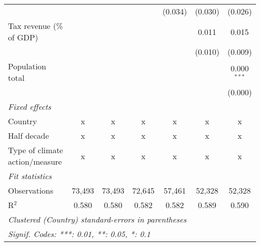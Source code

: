 \begin{tabular}{lcccccc}
                                                               &         &               &                & (0.034)       & (0.030)       & (0.026)\\   
   Tax revenue (\% of GDP)                                     &         &               &                &               & 0.011         & 0.015\\   
                                                               &         &               &                &               & (0.010)       & (0.009)\\   
   Population total                                            &         &               &                &               &               & 0.000$^{***}$\\   
                                                               &         &               &                &               &               & (0.000)\\   
   \emph{Fixed effects}\\
   Country                                                     & x       & x             & x              & x             & x             & x\\  
   Half decade                                                 & x       & x             & x              & x             & x             & x\\  
   Type of climate action/measure                              & x       & x             & x              & x             & x             & x\\  
   \midrule \emph{Fit statistics}\\
   Observations                                                & 73,493  & 73,493        & 72,645         & 57,461        & 52,328        & 52,328\\  
   R$^2$                                                       & 0.580   & 0.580         & 0.582          & 0.582         & 0.589         & 0.590\\  
   \midrule
   \multicolumn{7}{l}{\emph{Clustered (Country) standard-errors in parentheses}}\\
   \multicolumn{7}{l}{\emph{Signif. Codes: ***: 0.01, **: 0.05, *: 0.1}}\\
\end{tabular}
\par\endgroup


